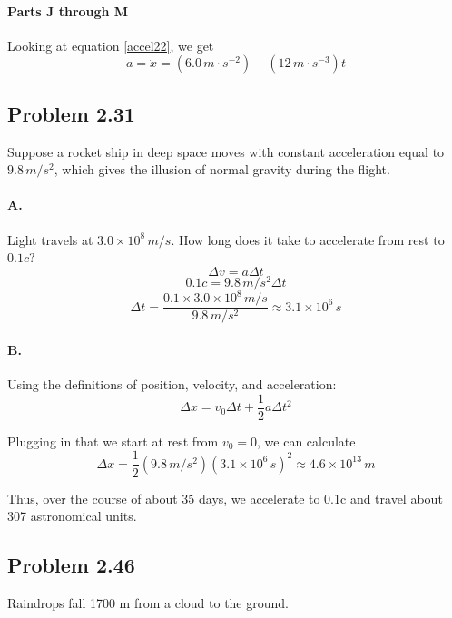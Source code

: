 \documentclass[12pt]{article}
\begin{document}
\paragraph{Parts J through M}
Looking at equation \eqref{accel22}, we get
\[a = \ddot x = (6.0\,\si{m\cdot s^{-2}}) - (12\,\si{m\cdot s^{-3}}) t\]


\newpage
\subsection{Problem 2.31}
Suppose a rocket ship in deep space moves with constant acceleration equal to $9.8\,\si{m/s^2}$, which gives the illusion of normal gravity during the flight. 

\paragraph{A.} Light travels at $3.0 \times 10^8\,\si{m/s}$. How long does it take to accelerate from rest to $0.1c$?
\[
\Delta v = a \Delta t
\]
\[
0.1c = 9.8\,\si{m/s^2} \Delta t
\]
\[
\Delta t = \frac{0.1 \times 3.0 \times 10^8\,\si{m/s}}{9.8\,\si{m/s^2}} \approx \boxed{3.1 \times 10^6\,\si{s}}
\]

\paragraph{B.} Using the definitions of position, velocity, and acceleration:
\[
\Delta x = v_0 \Delta t + \frac{1}{2} a \Delta t^2
\]

Plugging in that we start at rest from $v_0 = 0$, we can calculate
\[
\Delta x = \frac{1}{2} \left(9.8\,\si{m/s^2}\right)\left(3.1\times10^6\,\si{s}\right)^2 \approx \boxed{4.6\times10^{13}\,\si{m}}
\]

Thus, over the course of about 35 days, we accelerate to 0.1c and travel about 307 astronomical units.

\subsection{Problem 2.46}
Raindrops fall 1700 m from a cloud to the ground. 
\end{document}
